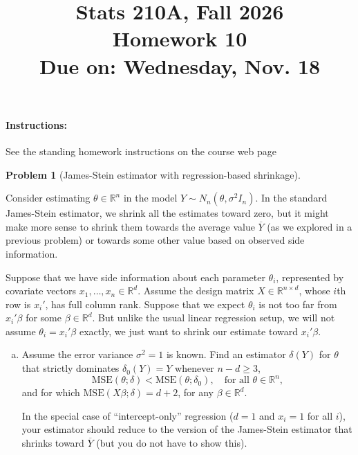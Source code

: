 \documentclass{article}
\newcommand{\RR}{\mathbb{R}}
\theoremstyle{definition}
\newtheorem{problem}{Problem}
\begin{document}
\title{Stats 210A, Fall 2026\\
  Homework 10 \\
  {\large {\bf Due on}: Wednesday, Nov. 18}}
\date{}

\maketitle

\paragraph{Instructions:} See the standing homework instructions on the course web page


\begin{problem}[James-Stein estimator with regression-based shrinkage]
\label{prob:js-regression}

Consider estimating $\theta \in \RR^n$ in the model $Y \sim N_n(\theta, \sigma^2 I_n)$. In the standard James-Stein estimator, we shrink all the estimates toward zero, but it might make more sense to shrink them towards the average value $\overline{Y}$ (as we explored in a previous problem) or towards some other value based on observed side information.

Suppose that we have side information about each parameter $\theta_i$, represented by covariate vectors $x_1,\ldots,x_n \in \RR^d$. Assume the design matrix $X \in \RR^{n\times d}$, whose $i$th row is $x_i'$, has full column rank. Suppose that we expect $\theta_i$ is not too far from $x_i'\beta$ for some $\beta\in \RR^d$. But unlike the usual linear regression setup, we will not assume $\theta_i = x_i'\beta$ exactly, we just want to shrink our estimate toward $x_i'\beta$.

\begin{enumerate}[(a)]

\item Assume the error variance $\sigma^2 = 1$ is known. Find an estimator $\delta(Y)$ for $\theta$ that strictly dominates $\delta_0(Y) = Y$ whenever $n - d \geq 3$,
\[
\text{MSE}(\theta; \delta) < \text{MSE}(\theta; \delta_0), \quad \text{for all } \theta \in \RR^n,
\]
and for which $\text{MSE}(X\beta; \delta) = d + 2$, for any $\beta\in \RR^d$.

In the special case of ``intercept-only'' regression ($d=1$ and $x_i=1$ for all $i$), your estimator should reduce to the version of the James-Stein estimator that shrinks toward $\overline{Y}$ (but you do not have to show this).


\end{enumerate}
\end{problem}
\end{document}
